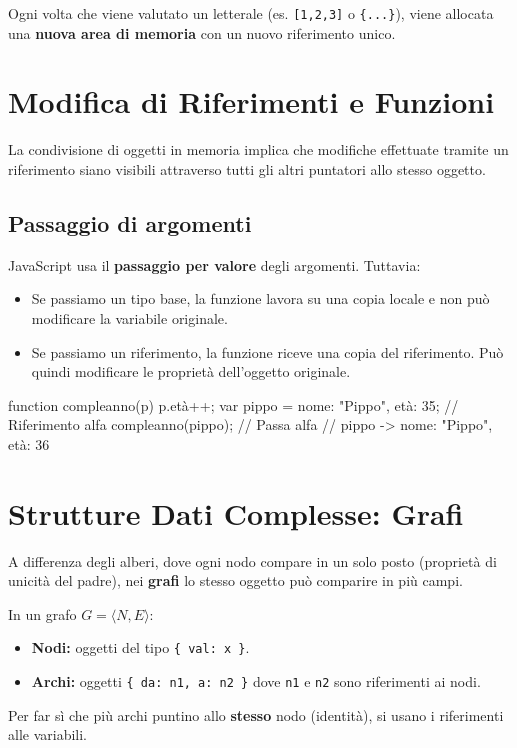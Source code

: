 \begin{concept}
Ogni volta che viene valutato un letterale (es. \texttt{[1,2,3]} o \texttt{\{...\}}), viene allocata una \textbf{nuova area di memoria} con un nuovo riferimento unico.
\end{concept}

\section{Modifica di Riferimenti e Funzioni}
La condivisione di oggetti in memoria implica che modifiche effettuate tramite un riferimento siano visibili attraverso tutti gli altri puntatori allo stesso oggetto.

\subsection{Passaggio di argomenti}
JavaScript usa il \textbf{passaggio per valore} degli argomenti. Tuttavia:
\begin{itemize}
    \item Se passiamo un tipo base, la funzione lavora su una copia locale e non può modificare la variabile originale.
    \item Se passiamo un riferimento, la funzione riceve una copia del riferimento. Può quindi modificare le proprietà dell'oggetto originale.
\end{itemize}

\begin{jsbox}
function compleanno(p) { p.età++; }
var pippo = {nome: "Pippo", età: 35}; // Riferimento alfa
compleanno(pippo); // Passa alfa
// pippo -> {nome: "Pippo", età: 36}
\end{jsbox}

\section{Strutture Dati Complesse: Grafi}
A differenza degli alberi, dove ogni nodo compare in un solo posto (proprietà di unicità del padre), nei \textbf{grafi} lo stesso oggetto può comparire in più campi.

\begin{definition}
In un grafo $G = \langle N, E \rangle$:
\begin{itemize}
    \item \textbf{Nodi:} oggetti del tipo \texttt{\{ val: x \}}.
    \item \textbf{Archi:} oggetti \texttt{\{ da: n1, a: n2 \}} dove \texttt{n1} e \texttt{n2} sono riferimenti ai nodi.
\end{itemize}
Per far sì che più archi puntino allo \textbf{stesso} nodo (identità), si usano i riferimenti alle variabili.
\end{definition}

